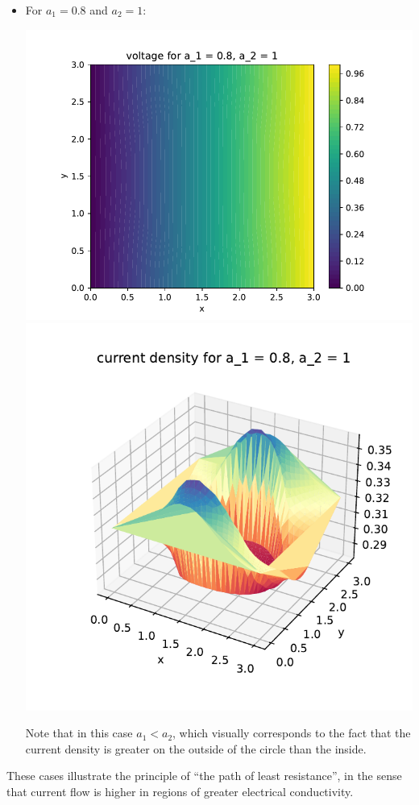 \documentclass{article}
\newcommand{\sep}[1][.5cm]{\vspace{#1}}
\begin{document}
\begin{itemize}
	\item For $a_1=0.8$ and $a_2=1$:
	\begin{center}
		\includegraphics[scale=.4]{hw8 voltage 2}
		\includegraphics[scale=.4]{hw8 current 2}
	\end{center}
	Note that in this case $a_1<a_2$, which visually corresponds to the fact that the current density is greater on the outside of the circle than the inside.
\end{itemize}
These cases illustrate the principle of ``the path of least resistance'', in the sense that current flow is higher in regions of greater electrical conductivity.
\sep
\end{document}

